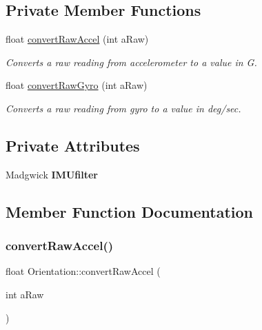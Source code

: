 \subsection*{Private Member Functions}
\begin{DoxyCompactItemize}
\item 
float \hyperlink{class_orientation_ab8a6f65b7f2b43ec5dd09c47fe93fa0b}{convert\+Raw\+Accel} (int a\+Raw)
\begin{DoxyCompactList}\small\item\em Converts a raw reading from accelerometer to a value in G. \end{DoxyCompactList}\item 
float \hyperlink{class_orientation_a99bb5ed3c3226c5d636fa48f26f491dd}{convert\+Raw\+Gyro} (int a\+Raw)
\begin{DoxyCompactList}\small\item\em Converts a raw reading from gyro to a value in deg/sec. \end{DoxyCompactList}\end{DoxyCompactItemize}
\subsection*{Private Attributes}
\begin{DoxyCompactItemize}
\item 
\mbox{\label{class_orientation_a3b0d70328334e69797438ccc408806c1}} 
Madgwick {\bfseries I\+M\+Ufilter}
\end{DoxyCompactItemize}


\subsection{Member Function Documentation}
\mbox{\label{class_orientation_ab8a6f65b7f2b43ec5dd09c47fe93fa0b}} 
\subsubsection{\texorpdfstring{convert\+Raw\+Accel()}{convertRawAccel()}}
{\footnotesize\ttfamily float Orientation\+::convert\+Raw\+Accel (\begin{DoxyParamCaption}\item[{int}]{a\+Raw }\end{DoxyParamCaption})\hspace{0.3cm}{\ttfamily [private]}}




